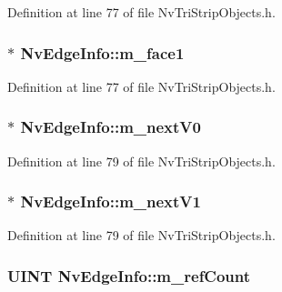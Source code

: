 Definition at line 77 of file NvTriStripObjects.h.\hypertarget{class_nv_edge_info_6031db0057791a0e50693be9ee9773c7}{
\subsubsection[{m\_\-face1}]{ $\ast$ {\bf NvEdgeInfo::m\_\-face1}}}
\label{class_nv_edge_info_6031db0057791a0e50693be9ee9773c7}




Definition at line 77 of file NvTriStripObjects.h.\hypertarget{class_nv_edge_info_d04625aff80b39f74e71de9e2fe641d9}{
\subsubsection[{m\_\-nextV0}]{$\ast$ {\bf NvEdgeInfo::m\_\-nextV0}}}
\label{class_nv_edge_info_d04625aff80b39f74e71de9e2fe641d9}




Definition at line 79 of file NvTriStripObjects.h.\hypertarget{class_nv_edge_info_14950ee3291cc7197890f906fe9ed746}{
\subsubsection[{m\_\-nextV1}]{ $\ast$ {\bf NvEdgeInfo::m\_\-nextV1}}}
\label{class_nv_edge_info_14950ee3291cc7197890f906fe9ed746}




Definition at line 79 of file NvTriStripObjects.h.\hypertarget{class_nv_edge_info_1fb4a1a1d3229639c3861c17828f417e}{
\subsubsection[{m\_\-refCount}]{\setlength{\rightskip}{0pt plus 5cm}UINT {\bf NvEdgeInfo::m\_\-refCount}}}
\label{class_nv_edge_info_1fb4a1a1d3229639c3861c17828f417e}





